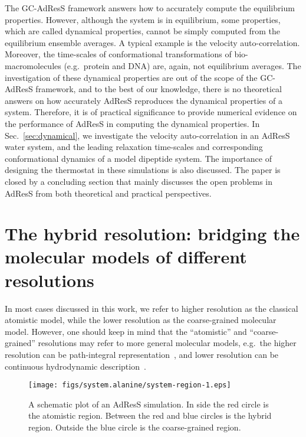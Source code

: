 \documentclass[epjST]{svjour}
\begin{document}
The GC-AdResS framework answers how to accurately compute the  equilibrium properties.
However, although the system is in equilibrium,
some properties, which are called dynamical properties, cannot be simply computed from the equilibrium ensemble averages.
A typical example is the velocity auto-correlation.
Moreover, the time-scales of conformational transformations
of bio-macromolecules (e.g.~protein and DNA)
are, again, not equilibrium averages.
The investigation of these  dynamical properties are out of the scope of the GC-AdResS framework,
and to the best of our knowledge, there is no theoretical answers on how accurately  AdResS reproduces the 
dynamical properties of a system.
Therefore, it is of practical significance to  provide numerical
evidence on the performance of AdResS in computing the dynamical properties.
In Sec.~\ref{sec:dynamical}, we investigate the
velocity auto-correlation in an AdResS water system, and the
leading relaxation time-scales and corresponding conformational dynamics of
a model dipeptide system.
The importance of designing the thermostat in these simulations
is also discussed.
The paper is closed by a concluding section
that mainly discusses the open problems in AdResS from both theoretical
and practical perspectives.

\section{The hybrid resolution: bridging the molecular models of different resolutions}
\label{sec:design}

In most cases discussed in this work, we refer to higher resolution as the classical atomistic model, while
the lower resolution as the coarse-grained molecular model. However,
one should keep in mind that the ``atomistic'' and ``coarse-grained'' resolutions
may refer to more general molecular models, e.g.~the higher resolution can be
path-integral representation~\cite{poma2010classical}, and lower resolution can be continuous
hydrodynamic description~\cite{delgado2009coupling}.

\begin{figure}
  \centering
  \texttt{[image: figs/system.alanine/system-region-1.eps]}
  \caption{A schematic plot of an AdResS simulation. In side the red circle is the atomistic region. Between the red and blue circles is the hybrid region. Outside the blue circle is the coarse-grained region.}
  \label{fig:sys-region}
\end{figure}
\end{document}
